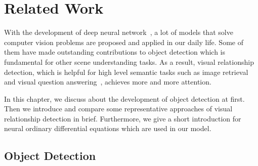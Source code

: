 \chapter{Related Work}
\label{chap:relatedwork}
With the development of deep neural network~\cite{krizhevsky2012imagenet,he2016deep}, a lot of models that solve computer vision problems are proposed and applied in our daily life. Some of them have made outstanding contributions to object detection which is fundamental for other scene understanding tasks. As a result, visual relationship detection, which is helpful for high level semantic tasks such as image retrieval~\cite{johnson2015image} and visual question answering~\cite{ren2015exploring}, achieves more and more attention. 

In this chapter, we discuss about the development of object detection at first. Then we introduce and compare some representative approaches of visual relationship detection in brief. Furthermore, we give a short introduction for neural ordinary differential equations which are used in our model.

\section{Object Detection}

